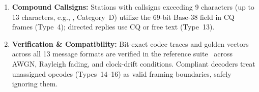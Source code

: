 \begin{enumerate}[leftmargin=1.4em, itemsep=1.5pt plus 1pt minus 0.5pt, topsep=2pt, parsep=0pt]
  \item \textbf{Compound Callsigns:} Stations with callsigns exceeding 9 characters (up to 13 characters, e.g., , Category~D) utilize the 69-bit Base-38 field in CQ frames (Type~4); directed replies use CQ or free text (Type~13).
  \item \textbf{Verification \& Compatibility:} Bit-exact codec traces and golden vectors across all 13 message formats are verified in the reference suite~\cite{lqlib} across AWGN, Rayleigh fading, and clock-drift conditions. Compliant decoders treat unassigned opcodes (Types~14--16) as valid framing boundaries, safely ignoring them.
\end{enumerate}
\vspace*{-4.0pt}

\pagebreak
